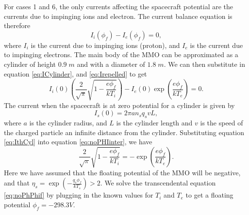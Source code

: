 For cases 1 and 6, the only currents affecting the spacecraft potential are the currents due to impinging ions and electron. The current balance equation is therefore
\begin{equation}\label{eq:noPHCurrentBal}
    I_i(\phi_f) - I_e(\phi_f) = 0,
\end{equation}
where $I_i$ is the current due to impinging ions (proton), and $I_e$ is the current due to impinging electrons. The main body of the MMO can be approximated as a cylinder of height $0.9 \; m$ and with a diameter of $1.8 \; m$. We can then substitute in equation \eqref{eq:ICylinder}, and \eqref{eq:Irepelled} to get
\begin{equation}\label{eq:noPHIinter}
  I_i(0)\left(\frac{2}{\sqrt{\pi}} \sqrt{1 -  \frac{e \phi_f}{k T_i}}\right) -  I_e(0)\exp(\frac{e \phi_f}{k T_e}) = 0.
\end{equation}
The current when the spacecraft is at zero potential for a cylinder is given by \parencite{LAI2019}
\begin{equation}\label{eq:IthCyl}
    I_s(0) = 2 \pi a n_s q_s v L,
\end{equation}
where $a$ is the cylinder radius, and $L$ is the cylinder length and $v$ is the speed of the charged particle an infinite distance from the cylinder. Substituting equation \eqref{eq:IthCyl} into equation \eqref{eq:noPHIinter}, we have
\begin{equation}\label{eq:noPhPhif}
    \frac{2}{\sqrt{\pi}} \sqrt{1 -  \frac{e \phi_f}{k T_i}} = - \exp(\frac{e \phi_f}{k T_e}).
\end{equation}
Here we have assumed that the floating potential of the MMO will be negative, and that $\eta_s = \exp(- \frac{q_s \phi_f}{k T_s}) > 2$. We solve the transcendental equation \eqref{eq:noPhPhif} by plugging in the known values for $T_i$ and $T_e$ to get a floating potential $\phi_f = -298.3 V$.
